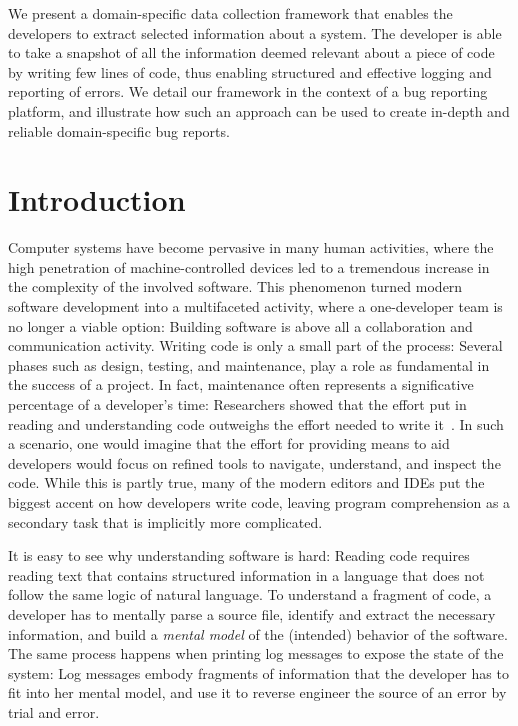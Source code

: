 We present a domain-specific data collection framework that enables the developers to extract selected information about a system. The developer is able to take a snapshot of all the information deemed relevant about a piece of code by writing few lines of code, thus enabling structured and effective logging and reporting of errors. We detail our framework in the context of a bug reporting platform, and illustrate how such an approach can be used to create in-depth and reliable domain-specific bug reports.




\section{Introduction} \label{sec:introduction}

Computer systems have become pervasive in many human activities, where the high penetration of machine-controlled devices led to a tremendous increase in the complexity of the involved software. This phenomenon turned modern software development into a multifaceted activity, where a one-developer team is no longer a viable option: Building software is above all a collaboration and communication activity. Writing code is only a small part of the process: Several phases such as design, testing, and maintenance, play a role as fundamental in the success of a project. In fact, maintenance often represents a significative percentage of a developer's time: Researchers showed that the effort put in reading and understanding code outweighs the effort needed to write it~\cite{Corb1989,Fjel1983,Zelk1979,Mine2015b}. In such a scenario, one would imagine that the effort for providing means to aid developers would focus on refined tools to navigate, understand, and inspect the code. While this is partly true, many of the modern editors and IDEs put the biggest accent on how developers write code, leaving program comprehension as a secondary task that is implicitly more complicated.

 It is easy to see why understanding software is hard: Reading code requires reading text that contains structured information in a language that does not follow the same logic of natural language. To understand a fragment of code, a developer has to mentally parse a source file, identify and extract the necessary information, and build a \emph{mental model} of the (intended) behavior of the software. The same process happens when printing log messages to expose the state of the system: Log messages embody fragments of information that the developer has to fit into her mental model, and use it to reverse engineer the source of an error by trial and error.

